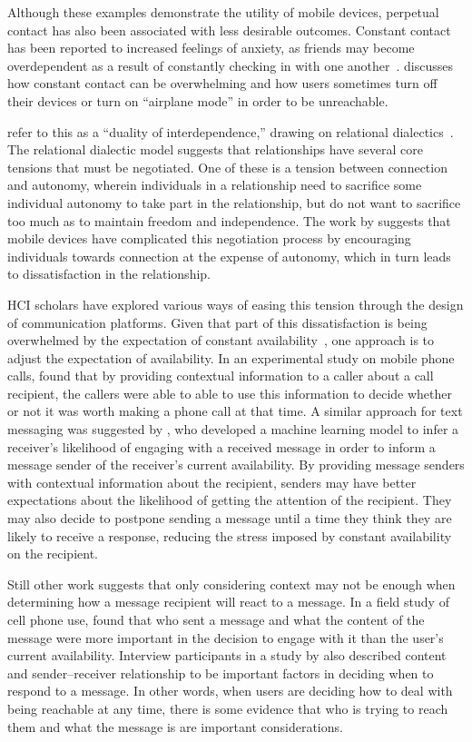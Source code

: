 \documentclass[12pt]{nuthesis}	%
\begin{document}
Although these examples demonstrate the utility of mobile devices, perpetual contact has also been associated with less desirable outcomes. Constant contact has been reported to increased feelings of anxiety, as friends may become overdependent as a result of constantly checking in with one another~\citep{baym2015personal}. \citet{ames2013managing} discusses how constant contact can be overwhelming and how users sometimes turn off their devices or turn on ``airplane mode'' in order to be unreachable.

\citet{hall2012calling} refer to this as a ``duality of interdependence,'' drawing on relational dialectics~\citep{baxter1993relationship}. The relational dialectic model suggests that relationships have several core tensions that must be negotiated. One of these is a tension between connection and autonomy, wherein individuals in a relationship need to sacrifice some individual autonomy to take part in the relationship, but do not want to sacrifice too much as to maintain freedom and independence. The work by \citeauthor{hall2012calling} suggests that mobile devices have complicated this negotiation process by encouraging individuals towards connection at the expense of autonomy, which in turn leads to dissatisfaction in the relationship.

HCI scholars have explored various ways of easing this tension through the design of communication platforms. Given that part of this dissatisfaction is being overwhelmed by the expectation of constant availability~\citep{ames2013managing}, one approach is to adjust the expectation of availability.  In an experimental study on mobile phone calls, \citet{avrahami2007improving} found that by providing contextual information to a caller about a call recipient, the callers were able to able to use this information to decide whether or not it was worth making a phone call at that time. A similar approach for text messaging was suggested by \citet{pielot2014didn}, who developed a machine learning model to infer a receiver's likelihood of engaging with a received message in order to inform a message sender of the receiver's current availability. By providing message senders with contextual information about the recipient, senders may have better expectations about the likelihood of getting the attention of the recipient. They may also decide to postpone sending a message until a time they think they are likely to receive a response, reducing the stress imposed by constant availability on the recipient.

Still other work suggests that only considering context may not be enough when determining how a message recipient will react to a message. In a field study of cell phone use, \citet{grandhi2010technology} found that who sent a message and what the content of the message were more important in the decision to engage with it than the user's current availability. Interview participants in a study by \citet{wohn2015ambient} also described content and sender--receiver relationship to be important factors in deciding when to respond to a message. In other words, when users are deciding how to deal with being reachable at any time, there is some evidence that who is trying to reach them and what the message is are important considerations.
\end{document}
